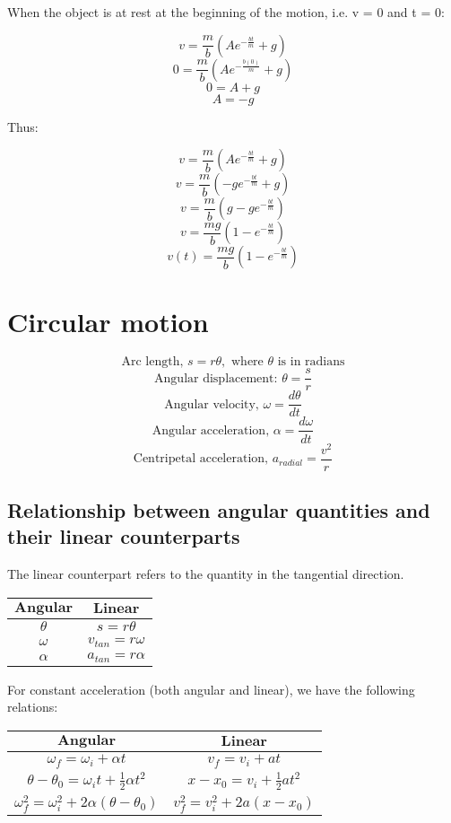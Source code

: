\documentclass[11pt]{article}
\begin{document}
When the object is at rest at the beginning of the motion, i.e. v = 0 and t = 0:

\[v = \frac{m}{b} (Ae^{-\frac{bt}{m}} + g)\]
\[0 = \frac{m}{b} (Ae^{-\frac{b(0)}{m}} + g)\]
\[0 = A + g\]
\[A = -g\]

\newpage

Thus:

\[v = \frac{m}{b} (Ae^{-\frac{bt}{m}} + g)\]
\[v = \frac{m}{b} (-ge^{-\frac{bt}{m}} + g)\]
\[v = \frac{m}{b} (g - ge^{-\frac{bt}{m}})\]
\[v = \frac{mg}{b} (1 - e^{-\frac{bt}{m}})\]
\[v(t) = \frac{mg}{b} (1 - e^{-\frac{bt}{m}})\]
\section{Circular motion}
\label{sec:org05c5c9f}
\[\text{Arc length, } s = r \theta, \text{ where } \theta \text{ is in radians}\]
\[\text{Angular displacement: } \theta = \frac{s}{r}\]
\[\text{Angular velocity, } \omega = \frac{d \theta}{dt}\]
\[\text{Angular acceleration, } \alpha = \frac{d \omega}{dt}\]
\[\text{Centripetal acceleration, } a_{radial} = \frac{v^2}{r}\]
\subsection{Relationship between angular quantities and their linear counterparts}
\label{sec:org03c6f4f}
The linear counterpart refers to the quantity in the tangential direction.

\begin{center}
\begin{tabular}{ c|c }
\(\textbf{Angular}\) & \(\textbf{Linear}\) \\
\hline
\(\theta\) & \(s = r\theta\) \\
\(\omega\) & \(v_{tan} = r\omega\) \\
\(\alpha\) & \(a_{tan} = r\alpha\) \\
\end{tabular}
\end{center}

For constant acceleration (both angular and linear), we have the following relations:
\begin{center}
\begin{tabular}{ c|c }
\(\textbf{Angular}\) & \(\textbf{Linear}\) \\
\hline
\(\omega_f = \omega_i + \alpha t\) & \(v_f = v_i + at\) \\
\(\theta - \theta_0 = \omega_i t + \frac{1}{2} \alpha t^2\) & \(x - x_0 = v_i + \frac{1}{2} a t^2\) \\
\(\omega_f^2 = \omega_i^2 + 2 \alpha(\theta - \theta_0)\) & \(v_f^2 = v_i^2 + 2a(x - x_0)\)
\end{tabular}
\end{center}
\end{document}
